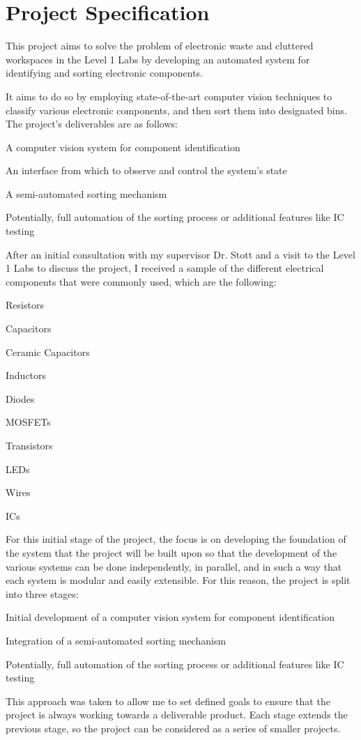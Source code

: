 \section{Project Specification}
\label{sec:project-specification}
This project aims to solve the problem of electronic waste and cluttered workspaces in the Level 1 Labs
by developing an automated system for identifying and sorting electronic components.

It aims to do so by employing state-of-the-art computer vision techniques to classify various electronic components,
and then sort them into designated bins. The project's deliverables are as follows:
\begin{mylist}
  \item A computer vision system for component identification
  \item An interface from which to observe and control the system's state
  \item A semi-automated sorting mechanism
  \item Potentially, full automation of the sorting process or additional features like IC testing
\end{mylist}
\noindent
After an initial consultation with my supervisor Dr. Stott and a visit to the Level 1 Labs to discuss the project, I received a sample
of the different electrical components that were commonly used, which are the following:
\begin{multicols}{2}
  \begin{mylist}
    \item Resistors
    \item Capacitors
    \item Ceramic Capacitors
    \item Inductors
    \item Diodes
    \item MOSFETs
    \item Transistors
    \item LEDs
    \item Wires
    \item ICs
  \end{mylist}
\end{multicols}

\noindent
For this initial stage of the project, the focus is on developing the foundation of the system that the project
will be built upon so that the development of the various systems can be done independently, in parallel, and in such a way that each system
is modular and easily extensible. For this reason, the project is split into three stages:
\begin{mylist}
  \item Initial development of a computer vision system for component identification
  \item Integration of a semi-automated sorting mechanism
  \item Potentially, full automation of the sorting process or additional features like IC testing
\end{mylist}
This approach was taken to allow me to set defined goals to ensure that the project is always working towards a deliverable product.
Each stage extends the previous stage, so the project can be considered as a series of smaller projects. 
